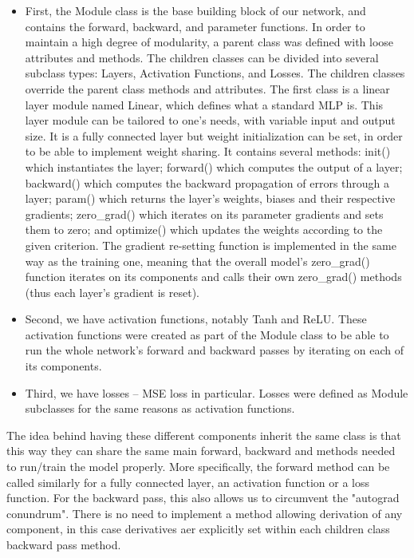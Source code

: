 \documentclass[11pt, a4paper]{article}
\begin{document}
\begin{itemize}
\item First, the Module class is the base building block of our network, and contains the forward, backward, and parameter functions. In order to maintain a high degree of modularity, a parent class was defined with loose attributes and methods. The children classes can be divided into several subclass types: Layers, Activation Functions, and Losses. The children classes override the parent class methods and attributes.
The first class is a linear layer module named Linear, which defines what a standard MLP is. This layer module can be tailored to one's needs, with variable input and output size. It is a fully connected layer but weight initialization can be set, in order to be able to implement weight sharing. 
It contains several methods: init() which instantiates the layer; forward() which computes the output of a layer; backward() which computes the backward propagation of errors through a layer; param() which returns the layer's weights, biases and their respective gradients; zero\_grad() which iterates on its parameter gradients and sets them to zero; and optimize() which updates the weights according to the given criterion.
The gradient re-setting function is implemented in the same way as the training one, meaning that the overall model's zero\_grad() function iterates on its components and calls their own zero\_grad() methods (thus each layer's gradient is reset).

\item Second, we have activation functions, notably Tanh and ReLU. These activation functions were created as part of the Module class to be able to run the whole network's forward and backward passes by iterating on each of its components.

\item Third, we have losses -- MSE loss in particular. Losses were defined as Module subclasses for the same reasons as activation functions.
\end{itemize}
The idea behind having these different components inherit the same class is that this way they can share the same main forward, backward and methods needed to run/train the model properly. More specifically, the forward method can be called similarly for a fully connected layer, an activation function or a loss function.
For the backward pass, this also allows us to circumvent the "autograd conundrum". There is no need to implement a method allowing derivation of any component, in this case derivatives aer explicitly set within each children class backward pass method.
\end{document}
